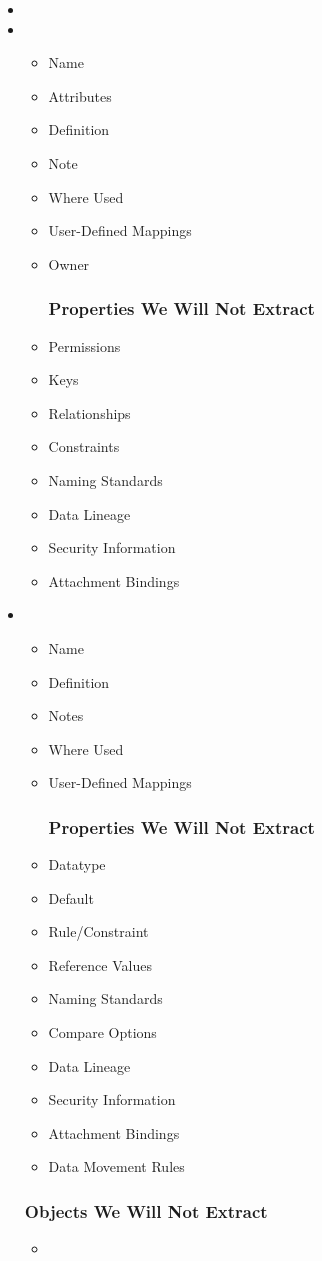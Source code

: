 \documentclass[12pt,a4paper]{report}
\begin{document}
\begin{itemize}
	\item {}
	\item {}
	\begin{itemize}
		\item Name 
		\item Attributes 
		\item Definition
		\item Note
		\item Where Used
		\item User-Defined Mappings
		\item Owner
		\subsubsection{Properties We Will Not Extract}
		\item Permissions 
		\item Keys 
		\item Relationships 
		\item Constraints 
		\item Naming Standards 
		\item Data Lineage
		\item Security Information
		\item Attachment Bindings
	\end{itemize}
	\item {}
	\begin{itemize}
		\item Name
		\item Definition
		\item Notes
		\item Where Used
		\item User-Defined Mappings
		\subsubsection{Properties We Will Not Extract}
		\item Datatype
		\item Default
		\item Rule/Constraint
		\item Reference Values
		\item Naming Standards
		\item Compare Options
		\item Data Lineage
		\item Security Information
		\item Attachment Bindings
		\item Data Movement Rules
	\end{itemize}
	\subsubsection{Objects We Will Not Extract}
	\begin{itemize}
		\item {}
	\end{itemize}
\end{itemize}
\end{document}
